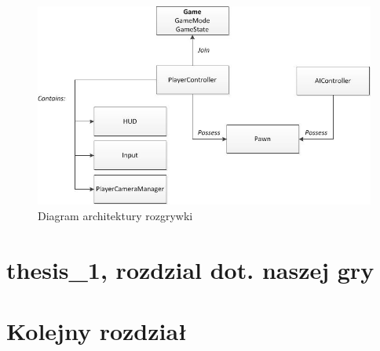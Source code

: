 \documentclass[multip]{SGGW-thesis}
\begin{document}
\begin{description}
\begin{figure}
	\centering
		\includegraphics[width=1\textwidth]{figures/gameplay_chart.jpg}
	\caption{Diagram architektury rozgrywki}
	\label{fig-gameplay-chart}
\end{figure}

\end{description}

\chapter{thesis\_1, rozdzial dot. naszej gry}

\chapter{Kolejny rozdział}
\end{document}
